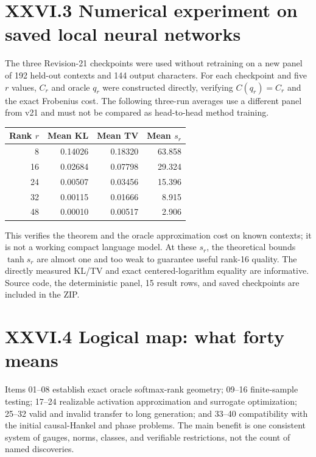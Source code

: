 \documentclass[11pt,a4paper,oneside]{book}
\begin{document}
\section*{XXVI.3 Numerical experiment on saved local neural networks}
The three Revision-21 checkpoints were used without retraining on a new panel of 192 held-out contexts and 144 output characters. For each checkpoint and five $r$ values, $C_r$ and oracle $q_r$ were constructed directly, verifying $C(q_r)=C_r$ and the exact Frobenius cost. The following three-run averages use a different panel from v21 and must not be compared as head-to-head method training.
\begin{center}\begin{tabular}{rrrr}\toprule
Rank $r$&Mean KL&Mean TV&Mean $s_r$\\\midrule
8&0.14026&0.18320&63.858\\16&0.02684&0.07798&29.324\\24&0.00507&0.03456&15.396\\32&0.00115&0.01666&8.915\\48&0.00010&0.00517&2.906\\\bottomrule
\end{tabular}\end{center}
This verifies the theorem and the oracle approximation cost on known contexts; it is not a working compact language model. At these $s_r$, the theoretical bounds $\tanh s_r$ are almost one and too weak to guarantee useful rank-16 quality. The directly measured KL/TV and exact centered-logarithm equality are informative. Source code, the deterministic panel, 15 result rows, and saved checkpoints are included in the ZIP.
\section*{XXVI.4 Logical map: what forty means}
Items 01--08 establish exact oracle softmax-rank geometry; 09--16 finite-sample testing; 17--24 realizable activation approximation and surrogate optimization; 25--32 valid and invalid transfer to long generation; and 33--40 compatibility with the initial causal-Hankel and phase problems. The main benefit is one consistent system of gauges, norms, classes, and verifiable restrictions, not the count of named discoveries.
\end{document}
